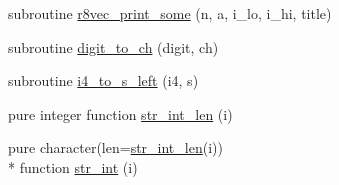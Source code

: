\begin{DoxyCompactItemize}
subroutine \hyperlink{classutils_a99f11e3629559c436b21305a07473d4d}{r8vec\-\_\-print\-\_\-some} (n, a, i\-\_\-lo, i\-\_\-hi, title)
\item 
subroutine \hyperlink{classutils_aa6b436f89f63f908b3a17a7339c9bfbf}{digit\-\_\-to\-\_\-ch} (digit, ch)
\item 
subroutine \hyperlink{classutils_a380db670d15265d5b5a6a003a3df926a}{i4\-\_\-to\-\_\-s\-\_\-left} (i4, s)
\item 
pure integer function \hyperlink{classutils_a17ce4bd3bad99b84b7151374817d485c}{str\-\_\-int\-\_\-len} (i)
\item 
pure character(len=\hyperlink{classutils_a17ce4bd3bad99b84b7151374817d485c}{str\-\_\-int\-\_\-len}(i)) \\*
function \hyperlink{classutils_ab7a03fd86144e0190731be8d84592345}{str\-\_\-int} (i)
\end{DoxyCompactItemize}


